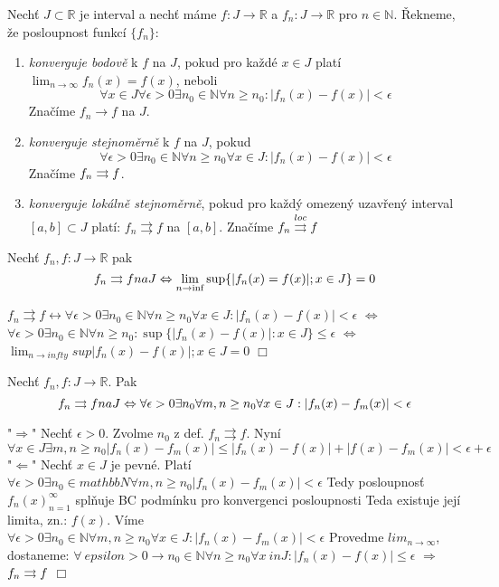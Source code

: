 \begin{definice}
Nechť $J \subset \mathbb{R}$ je interval a nechť máme $f : J \rightarrow \mathbb{R}$ a $f_n : J \rightarrow \mathbb{R}$ pro $n \in \mathbb{N}$. Řekneme, že posloupnost funkcí $\{f_n\}$:

\begin{enumerate}
\item \emph{konverguje bodově} k $f$ na $J$, pokud pro každé $x \in J$ platí $\lim_{n \rightarrow \infty} f_n(x) = f(x)$, neboli
$$\forall x \in J \forall \epsilon > 0 \exists n_0 \in \mathbb{N} \forall n \geq n_0 : |f_n(x) - f(x)| < \epsilon$$
Značíme $f_n \rightarrow f$ na $J$.
\item \emph{konverguje stejnoměrně} k $f$ na $J$, pokud
$$\forall \epsilon > 0 \exists n_0 \in \mathbb{N} \forall n \geq n_0 \forall x \in J : | f_n(x) - f(x) | < \epsilon$$
Značíme $f_n \rightrightarrows f$.
\item \emph{konverguje lokálně stejnoměrně}, pokud pro každý omezený uzavřený interval $[a, b] \subset J$ platí: $f_n \rightrightarrows f$ na $[a, b]$. Značíme $f_n \overset{loc}{\rightrightarrows} f$
\end{enumerate}
\end{definice}

\begin{vetal}
Nechť $f_n, f:J \rightarrow \mathbb{R}$ pak
$$f_n \rightrightarrows f na J \Leftrightarrow \lim_{n \rightarrow \inf} \sup \{ |f_n(x) = f(x)|; x \in J \} = 0$$
\end{vetal}
\begin{dukaz}
$f_n \rightrightarrows f \leftrightarrow \forall \epsilon > 0 \exists n_0 \in \mathbb{N} \forall n \geq n_0 \forall x \in J: |f_n(x) - f(x)| < \epsilon$
$\Leftrightarrow$
$\forall \epsilon > 0 \exists n_0 \in \mathbb{N} \forall n \geq n_0 : \sup \{ |f_n(x) - f(x) | : x \in J \} \leq \epsilon$
$\Leftrightarrow$
$\lim_{n \to infty} sup{|f_n(x)-f(x)|;x \in J} = 0$
$\Box$
\end{dukaz}

\begin{vetat}
Nechť $f_n,f : J \rightarrow \mathbb{R}$. Pak
$$f_n \rightrightarrows f na J \Leftrightarrow \forall \epsilon > 0 \exists n_0 \forall m,n \geq n_0 \forall x \in J : | f_n(x) - f_m(x)| < \epsilon$$
\end{vetat}
\begin{dukaz}
"$\Rightarrow$" 
Nechť $\epsilon > 0.$ Zvolme $n_0$ z def. $f_n \rightrightarrows f.$ 
Nyní $\forall x \in J \exists m,n \geq n_0 |f_n(x) - f_m(x) | \leq |f_n(x) - f(x)| + |f(x) - f_m(x)| < \epsilon + \epsilon $
"$\Leftarrow$"
Nechť $x \in J$ je pevné. Platí $\forall \epsilon > 0 \exists n_0 \in mathbb{N} \forall m,n \geq n_0|f_n(x) - f_m(x)| < \epsilon$
Tedy posloupnosť ${f_n(x)}_{n=1}^\infty$ splňuje BC podmínku pro konvergenci posloupnosti Teda existuje její limita, zn.: $f(x)$.
Víme $\forall \epsilon > 0 \exists n_0 \in \mathbb{N} \forall m,n \geq n_0 \forall x \in J: |f_n(x)-f_m(x)|<\epsilon$
Provedme $lim_{n \to \infty}$, dostaneme:
$\forall \ epsilon > 0 \rightarrow n_0 \in \mathbb{N} \forall n \geq n_0 \forall x\ in J: |f_n(x) - f(x)| \leq \epsilon$
$\Rightarrow$
$f_n \rightrightarrows f$
$\Box$
\end{dukaz}

